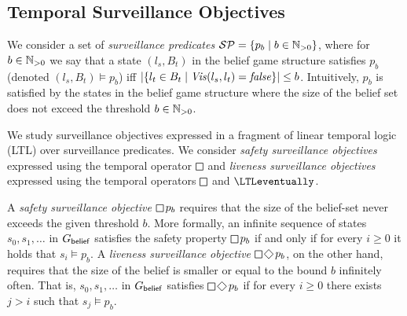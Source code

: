 \subsection{Temporal Surveillance Objectives}
We consider a set of \emph{surveillance predicates} $\mathcal{SP} = \{p_b \mid b \in \mathbb{N}_{>0}\}$, where for $b \in \mathbb{N}_{>0}$ we say that a state $(l_s,B_t)$ in the belief game structure satisfies $p_b$ (denoted $(l_s,B_t) \models p_b$) iff 
$|\{l_t \in B_t  \mid \mathit{Vis}(l_s,l_t)  = \mathit{false} \}| \leq b$.
Intuitively, $p_b$ is satisfied by the states in the belief game structure where the size of the belief set does not exceed the threshold $b \in \mathbb{N}_{>0}$.

We study surveillance objectives expressed in a fragment  of linear temporal logic (LTL) over surveillance predicates.  We consider  \emph{safety surveillance objectives} expressed using the temporal operator $\LTLglobally$ and \emph{liveness surveillance objectives} expressed using the temporal operators $\LTLglobally$ and $\LTLeventually$.

A \emph{safety surveillance objective} $\LTLglobally p_b$ requires that the size of the belief-set never exceeds the given threshold $b$. More formally, an infinite sequence of states $s_0,s_1,\ldots$ in $G_{\mathsf{belief}}$ satisfies the safety property $\LTLglobally p_b$ if and only if for every $i\geq 0$ it holds that $s_i \models p_b$.  A \emph{liveness surveillance objective} $\LTLglobally\LTLfinally p_b$, on the other hand, requires that 
the size of the belief is smaller or equal to the bound $b$  infinitely often. That is, $s_0,s_1,\ldots$ in $G_{\mathsf{belief}}$ satisfies $\LTLglobally\LTLfinally p_b$ if for every $i \geq 0$ there exists $j >i$ such that $s_j\models p_b$. 

